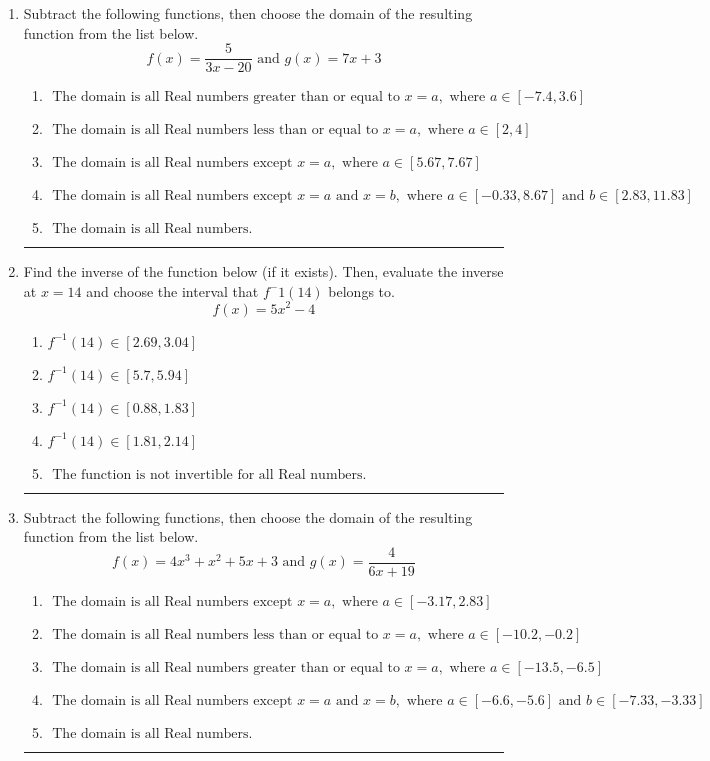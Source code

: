 \documentclass[14pt]{extbook}
\newcommand{\litem}[1]{\item#1\hspace*{-1cm}\rule{\textwidth}{0.4pt}}
\begin{document}
\begin{enumerate}
{\begin{enumerate}[label=\Alph*.]
\end{enumerate} }
\litem{
Subtract the following functions, then choose the domain of the resulting function from the list below.\[ f(x) = \frac{5}{3x-20} \text{ and } g(x) = 7x + 3 \]\begin{enumerate}[label=\Alph*.]
\item \( \text{ The domain is all Real numbers greater than or equal to } x = a, \text{ where } a \in [-7.4, 3.6] \)
\item \( \text{ The domain is all Real numbers less than or equal to } x = a, \text{ where } a \in [2, 4] \)
\item \( \text{ The domain is all Real numbers except } x = a, \text{ where } a \in [5.67, 7.67] \)
\item \( \text{ The domain is all Real numbers except } x = a \text{ and } x = b, \text{ where } a \in [-0.33, 8.67] \text{ and } b \in [2.83, 11.83] \)
\item \( \text{ The domain is all Real numbers. } \)

\end{enumerate} }
\litem{
Find the inverse of the function below (if it exists). Then, evaluate the inverse at $x = 14$ and choose the interval that $f^-1(14)$ belongs to.\[ f(x) = 5 x^2 - 4 \]\begin{enumerate}[label=\Alph*.]
\item \( f^{-1}(14) \in [2.69, 3.04] \)
\item \( f^{-1}(14) \in [5.7, 5.94] \)
\item \( f^{-1}(14) \in [0.88, 1.83] \)
\item \( f^{-1}(14) \in [1.81, 2.14] \)
\item \( \text{ The function is not invertible for all Real numbers. } \)

\end{enumerate} }
\litem{
Subtract the following functions, then choose the domain of the resulting function from the list below.\[ f(x) = 4x^{3} + x^{2} +5 x + 3 \text{ and } g(x) = \frac{4}{6x+19} \]\begin{enumerate}[label=\Alph*.]
\item \( \text{ The domain is all Real numbers except } x = a, \text{ where } a \in [-3.17, 2.83] \)
\item \( \text{ The domain is all Real numbers less than or equal to } x = a, \text{ where } a \in [-10.2, -0.2] \)
\item \( \text{ The domain is all Real numbers greater than or equal to } x = a, \text{ where } a \in [-13.5, -6.5] \)
\item \( \text{ The domain is all Real numbers except } x = a \text{ and } x = b, \text{ where } a \in [-6.6, -5.6] \text{ and } b \in [-7.33, -3.33] \)
\item \( \text{ The domain is all Real numbers. } \)


\end{enumerate}}
\end{enumerate}
\end{document}

